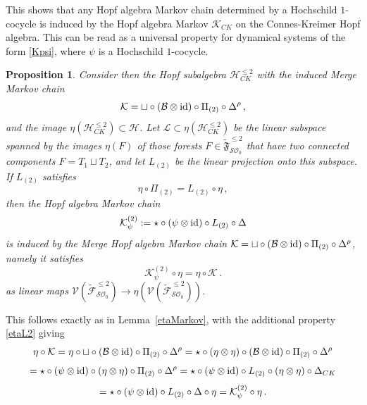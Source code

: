 \documentclass[12pt]{amsart}
\newtheorem{prop}{Proposition}[section]
\numberwithin{equation}{section}
\def\cB{{\mathcal B}}
\def\cF{{\mathcal F}}
\def\cH{{\mathcal H}}
\def\cK{{\mathcal K}}
\def\cL{{\mathcal L}}
\def\cO{{\mathcal O}}
\def\cS{{\mathcal S}}
\def\cV{{\mathcal V}}
\def\fF{{\mathfrak F}}
\begin{document}
This shows that any Hopf algebra Markov chain determined by a Hochschild $1$-cocycle
is induced by the Hopf algebra Markov $\cK_{CK}$ on the Connes-Kreimer Hopf algebra. 
This can be read as a universal property for dynamical systems of the form \eqref{Kpsi},
where $\psi$ is a Hochschild $1$-cocycle. 

\smallskip

\begin{prop}\label{MergeKeta}
Consider then the Hopf subalgebra $\cH_{CK}^{\leq 2}$ with
the induced Merge Markov chain
$$ \cK= \sqcup \circ (\cB \otimes {\rm id}) \circ \Pi_{(2)} \circ \Delta^\rho \, , $$
and the image $\eta(\cH_{CK}^{\leq 2})\subset \cH$. Let 
$\cL \subset \eta(\cH_{CK}^{\leq 2})$ be the linear subspace spanned by
the images $\eta(F)$ of those forests $F\in \tilde\fF_{\cS\cO_0}^{\leq 2}$ that have two
connected components $F=T_1 \sqcup T_2$, and let $L_{(2)}$ be the
linear projection onto this subspace. If $L_{(2)}$ satisfies
\begin{equation}\label{etaL2}
\eta \circ \Pi_{(2)}=L_{(2)} \circ \eta \, ,
\end{equation}
then the Hopf algebra Markov chain
\begin{equation}\label{Kpsi2}
\cK_\psi^{(2)}:= \star \circ (\psi \otimes {\rm id}) \circ L_{(2)} \circ \Delta
\end{equation}
is induced by the Merge Hopf algebra Markov chain $\cK=\sqcup\circ (\cB\otimes {\rm id})\circ \Pi_{(2)}\circ \Delta^\rho$, 
namely it satisfies
\begin{equation}\label{KetaK}
\cK_\psi^{(2)}\circ \eta = \eta \circ \cK \, .
\end{equation}
as linear maps $\cV(\tilde\cF_{\cS\cO_0}^{\leq 2}) \to \eta(\cV(\tilde\cF_{\cS\cO_0}^{\leq 2}))$. 
\end{prop}

\proof
This follows exactly as in Lemma~\ref{etaMarkov}, with the additional property \eqref{etaL2} giving
$$ \eta \circ \cK = \eta \circ \sqcup \circ (\cB\otimes {\rm id})\circ \Pi_{(2)}\circ \Delta^\rho = 
\star \circ (\eta \otimes \eta) \circ (\cB\otimes {\rm id})\circ \Pi_{(2)}\circ \Delta^\rho $$
$$ = \star \circ (\psi \otimes {\rm id})\circ (\eta \otimes \eta)  \circ \Pi_{(2)} \circ \Delta^\rho =
 \star \circ (\psi \otimes {\rm id})\circ L_{(2)} \circ (\eta \otimes \eta)  \circ \Delta_{CK} $$ $$ =
  \star \circ (\psi \otimes {\rm id})\circ L_{(2)} \circ \Delta \circ \eta = \cK_\psi^{(2)}\circ \eta\, . $$
  \endproof
  
 
\end{document}
